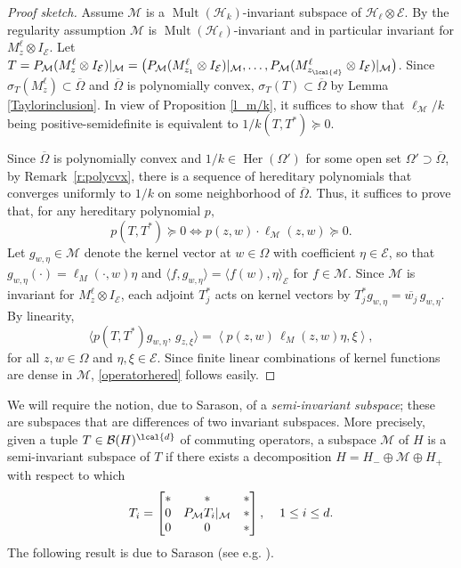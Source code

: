 \documentclass[a4paper,reqno,index]{amsart}
\newcommand{\df}[1]{{\textit{#1}}{\index{#1}}}
\numberwithin{equation}{section}
\newcommand{\Mult}{\operatorname{Mult}}
\newcommand{\cM}{\mathcal{M}}
\newcommand{\cH}{\mathcal{H}}
\newcommand{\specT}{\sigma_T}  %
\newcommand{\ol}[1]{\overline{#1}}
\newcommand{\Her}{\operatorname{Her}}
\theoremstyle{definition}
\begin{document}
 
\begin{proof}[Proof sketch] 
 Assume $\mathcal{M}$ is
 a $\Mult(\cH_k)$-invariant subspace of $\mathcal{H}_{\ell}\otimes {\mathcal{E}}.$ By the regularity assumption $\cM$ is
 $\Mult(\cH_\ell)$-invariant and in particular invariant
 for $M_z^\ell\otimes I_{\mathcal{E}}.$ Let $T=P_\mathcal{M}(M^{\ell}_z\otimes I_{\mathcal{E}})|_{\mathcal{M}}=\big(P_{\mathcal{M}}(M^{\ell}_{z_1}\otimes I_{\mathcal{E}})|_{\mathcal{M}}, \dots, P_{\mathcal{M}}(M^{\ell}_{z_{\lcal{d}}}\otimes I_{\mathcal{E}})|_{\mathcal{M}}\big)$. Since $\specT(M^{\ell}_z)\subset \overline{\Omega} $ and $ \overline{\Omega} $ is polynomially convex,  $\specT(T)\subset \overline{\Omega}$ by Lemma \ref{Taylorinclusion}. {In view of Proposition \ref{l_m/k}}, it suffices to show that $\ell_{\cM}/k$ being positive-semidefinite is equivalent to $1/k(T, T^*)\succeq 0.$
 
 

Since $\ol{\Omega}$ is polynomially convex and $1/k\in\Her(\Omega')$ for 
some open set $\Omega'\supset\ol{\Omega}$,   by Remark~\ref{r:polycvx}, there is a sequence of hereditary polynomials that converges uniformly to $1/k$ on some neighborhood of $\ol{\Omega}.$ Thus, it suffices to prove that, for any hereditary polynomial $p,$
\begin{equation}\label{operatorhered}
  p(T, T^*)\succeq 0 \Longleftrightarrow p(z,w)\cdot \ell_{\mathcal{M}}(z,w)\succeq 0.  
\end{equation}
Let $g_{w,\eta}\in \mathcal{M}$ denote the kernel vector at $w\in\Omega$ with coefficient
$\eta\in \mathcal{E}$, so that
$g_{w,\eta}(\cdot)=\ell_M(\cdot,w)\eta$
and
$\langle f, g_{w,\eta}\rangle = \langle f(w), \eta\rangle_{\mathcal{E}}$
for $f\in \mathcal{M}.$ Since $\mathcal{M}$ is invariant for $M^{\ell}_z\otimes I_{\mathcal{E}}$, each adjoint $T_j^*$ acts on kernel vectors by
$
T_j^* g_{w,\eta} = \overline{w_j}\, g_{w,\eta}.$
By linearity,
\[
\langle p(T,T^*) g_{w,\eta},\, g_{z,\xi}\rangle
=
\left\langle p(z,w)\,\ell_M(z,w)\eta,\xi \right\rangle,
\]
for all $z, w\in \Omega$ and $\eta, \xi\in\mathcal{E}$. Since finite linear combinations of kernel functions are dense in
$\mathcal{M}$, \eqref{operatorhered} follows easily.
\end{proof}





 We will require the notion, due to Sarason, of a \df{semi-invariant subspace}; these are subspaces that are differences of two invariant subspaces. More precisely,  given a tuple $T\in\mathcal{B}(H)^{\lcal{d}}$ of commuting operators, a  subspace $\mathcal{M}$ of $H$ is a semi-invariant subspace of $T$ if there exists a decomposition 
$H=H_{-}\oplus\mathcal{M}\oplus H_{+}$ with respect to which 
\[T_i=\begin{bmatrix}
  * & * & * \\
  0 & P_{\mathcal{M}}T_i|_{\mathcal{M}} & * \\
  0 & 0 & *
\end{bmatrix}, \hspace*{0.4 cm} 1\le i \le d. \]
The following result is due to Sarason (see e.g. \cite[Theorem 7.6]{Paulsenbook}).
\end{document}
